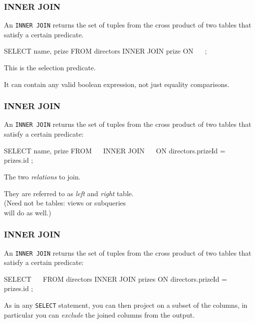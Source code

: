 \documentclass[english,serif,mathserif]{beamer}
\begin{document}
\begin{frame}[fragile]
  \frametitle{INNER JOIN}

  An \texttt{INNER JOIN} returns the set of tuples from the cross product of two
  tables that satisfy a certain predicate.

  \+
  \begin{sql}
SELECT name, prize
FROM directors INNER JOIN prize
ON ~~ ;
   \end{sql}

   \+
   This is the selection predicate.

   \+
   It can contain any valid boolean expression,
   not just equality comparisons.
\end{frame}


\begin{frame}[fragile]
  \frametitle{INNER JOIN}

  An \texttt{INNER JOIN} returns the set of tuples from the cross product of two
  tables that satisfy a certain predicate:

  \+
    \begin{sql}
SELECT name, prize
FROM ~~ INNER JOIN ~~
ON directors.prizeId = prizes.id ;
    \end{sql}

    \+
    The two \emph{relations} to join.

    \+
    They are referred to as \emph{left} and \emph{right} table.
    \\
    (Need not be tables: views or subqueries \\ will do as well.)
\end{frame}


\begin{frame}[fragile]
  \frametitle{INNER JOIN}

  An \texttt{INNER JOIN} returns the set of tuples from the cross product of two
  tables that satisfy a certain predicate:

  \+
    \begin{sql}
SELECT ~~
FROM directors INNER JOIN prizes
ON directors.prizeId = prizes.id ;
    \end{sql}

    \+
    As in any \texttt{SELECT} statement, you can then project on a subset of the
    columns, in particular you can \emph{exclude} the joined columns from the
    output.
\end{frame}
\end{document}
